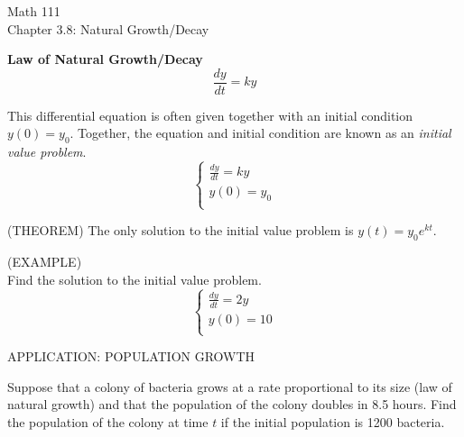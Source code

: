 \documentclass[11pt]{article}
\begin{document}
\begin{center}
\Large
\rm{Math 111}
\\
\rm{Chapter 3.8:  Natural Growth/Decay}
\\
\end{center}
\vspace{0.2in}

{\bf Law of Natural Growth/Decay}\\
\begin{displaymath}
\frac{dy}{dt} = ky  
\end{displaymath} 

\vspace{1in}
This differential equation is often given together with an initial condition $y(0)=y_0$.  Together, the equation and initial condition
are known as an \emph{initial value problem}.
\begin{displaymath}
  \left\{ \begin{array}{ll}
\frac{dy}{dt} = ky \\
y(0) = y_0 \\
\end{array} \right.
\end{displaymath}

\vspace{0.2in}

(THEOREM)
The only solution to the initial value problem is $y(t) = y_0e^{kt}$.

\vspace{0.2in}

(EXAMPLE)\\
Find the solution to the initial value problem.
\begin{displaymath}
  \left\{ \begin{array}{ll}
\frac{dy}{dt} = 2y \\
y(0) = 10 \\
\end{array} \right.
\end{displaymath}

\vspace{1in}

APPLICATION:  POPULATION GROWTH

\vspace{.1in}

Suppose that a colony of bacteria grows at a rate proportional to its size (law of natural growth) and that the population
of the colony doubles in 8.5 hours.  Find the population of the colony at time $t$ if the initial population is 1200 bacteria.
\end{document}
